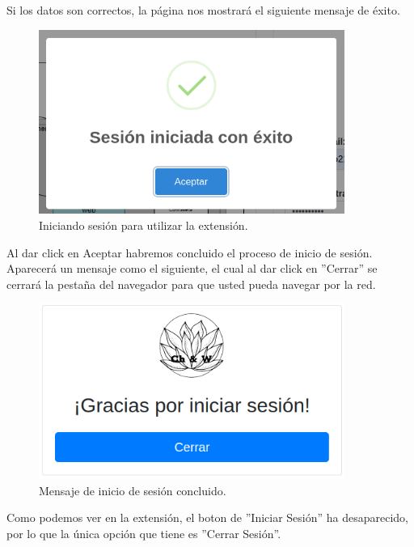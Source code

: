 \documentclass[12pt, a4paper, titlepage]{report}
\begin{document}
    	Si los datos son correctos, la página nos mostrará el siguiente mensaje de éxito.
    	
    	\begin{figure}[H]
    		\begin{center}	
    		\includegraphics[width=10cm]{./imagenes/Inicio_sesion/UI_certSavedInStorage.png}
    		\caption{Iniciando sesión para utilizar la extensión.}
    		\label{fig:guardadoStorage}
    		\end{center}
    	\end{figure}
    	
    	Al dar click en Aceptar habremos concluido el proceso de inicio de sesión. Aparecerá un mensaje como el siguiente, el cual al dar click en ''Cerrar'' se cerrará la pestaña del navegador para que usted pueda navegar por la red.
        
        \begin{figure}[H]
    		\begin{center}	
    		\includegraphics[width=10cm]{./imagenes/Inicio_sesion/graciasInicioSesion.png}
    		\caption{Mensaje de inicio de sesión concluido.}
    		\label{fig:LoginGracias}
    		\end{center}
    	\end{figure}
    	
    	Como podemos ver en la extensión, el boton de ''Iniciar Sesión'' ha desaparecido, por lo que la única opción que tiene es ''Cerrar Sesión''.
    	
\end{document}
